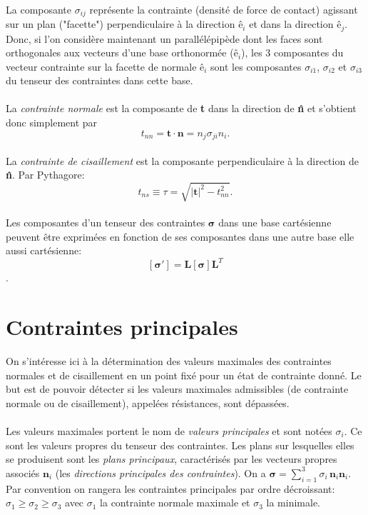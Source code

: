 \paragraph{}
La composante $\sigma_{ij}$ représente la contrainte (densité de force de contact) agissant sur un plan ("facette") perpendiculaire à la direction $\textbf{ê}_i$ et dans la direction $\textbf{ê}_j$. Donc, si l'on considère maintenant un parallélépipède dont les faces sont orthogonales aux vecteurs d'une base orthonormée ($\textbf{ê}_i$), les 3 composantes du vecteur contrainte sur la facette de normale $\textbf{ê}_i$ sont les composantes $\sigma_{i1}$, $\sigma_{i2}$ et $\sigma_{i3}$ du tenseur des contraintes dans cette base. 
\paragraph{}
La \emph{contrainte normale} est la composante de \textbf{t} dans la direction de \textbf{\^n} et s'obtient donc simplement par 
\begin{equation}
\label{eq:tnn}
t_{nn}=\textbf{t}\cdot\textbf{\^n}=n_j\sigma_{ji}n_i.
\end{equation}
\paragraph{}
La \emph{contrainte de cisaillement} est la composante perpendiculaire à la direction de \textbf{\^n}. Par Pythagore: 
\begin{equation}
\label{eq:tau}
t_{ns}\equiv\tau=\sqrt{|\textbf{t}|^2-t_{nn}^2}.
\end{equation}
\paragraph{}
Les composantes d'un tenseur des contraintes $\boldsymbol{\sigma}$ dans une base cartésienne peuvent être exprimées en fonction de ses composantes dans une autre base elle aussi cartésienne: $$[\boldsymbol{\sigma}']=\textbf{L}[\boldsymbol{\sigma}]\textbf{L}^T$$.
\section{Contraintes principales}
On s'intéresse ici à la détermination des valeurs maximales des contraintes normales et de cisaillement en un point fixé pour un état de contrainte donné. Le but est de pouvoir détecter si les valeurs maximales admissibles (de contrainte normale ou de cisaillement), appelées résistances, sont dépassées.
\paragraph{}
Les valeurs maximales portent le nom de \emph{valeurs principales} et sont notées $\sigma_i$. Ce sont les valeurs propres du tenseur des contraintes. Les plans sur lesquelles elles se produisent sont les \emph{plans principaux}, caractérisés par les vecteurs propres associés $\textbf{\^n}_i$ (les \emph{directions principales des contraintes}). On a $\boldsymbol{\sigma}=\sum_{i=1}^3 \sigma_i\,\textbf{\^n}_i\textbf{\^n}_i$. Par convention on rangera les contraintes principales par ordre décroissant: $\sigma_1\geq \sigma_2\geq\sigma_3$ avec $\sigma_1$ la contrainte normale maximale et $\sigma_3$ la minimale.
